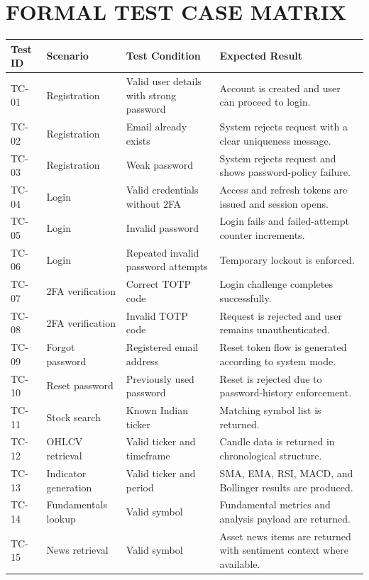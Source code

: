 \documentclass[12pt,a4paper]{report}
\begin{document}
\chapter{FORMAL TEST CASE MATRIX}
\begin{longtable}{p{} p{} p{} p{}}
\textbf{Test ID} & \textbf{Scenario} & \textbf{Test Condition} & \textbf{Expected Result} \\
\hline
TC-01 & Registration & Valid user details with strong password & Account is created and user can proceed to login. \\
TC-02 & Registration & Email already exists & System rejects request with a clear uniqueness message. \\
TC-03 & Registration & Weak password & System rejects request and shows password-policy failure. \\
TC-04 & Login & Valid credentials without 2FA & Access and refresh tokens are issued and session opens. \\
TC-05 & Login & Invalid password & Login fails and failed-attempt counter increments. \\
TC-06 & Login & Repeated invalid password attempts & Temporary lockout is enforced. \\
TC-07 & 2FA verification & Correct TOTP code & Login challenge completes successfully. \\
TC-08 & 2FA verification & Invalid TOTP code & Request is rejected and user remains unauthenticated. \\
TC-09 & Forgot password & Registered email address & Reset token flow is generated according to system mode. \\
TC-10 & Reset password & Previously used password & Reset is rejected due to password-history enforcement. \\
TC-11 & Stock search & Known Indian ticker & Matching symbol list is returned. \\
TC-12 & OHLCV retrieval & Valid ticker and timeframe & Candle data is returned in chronological structure. \\
TC-13 & Indicator generation & Valid ticker and period & SMA, EMA, RSI, MACD, and Bollinger results are produced. \\
TC-14 & Fundamentals lookup & Valid symbol & Fundamental metrics and analysis payload are returned. \\
TC-15 & News retrieval & Valid symbol & Asset news items are returned with sentiment context where available. \\

\end{longtable}
\end{document}
